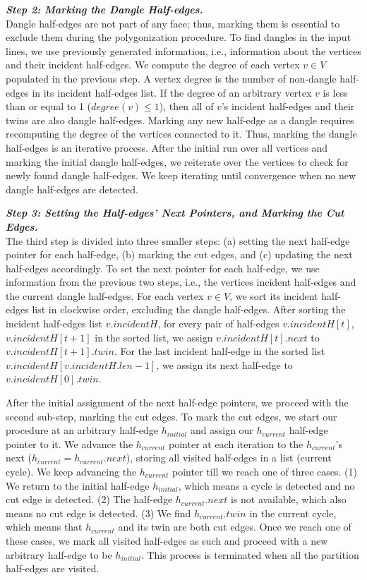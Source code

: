 \vspace{4pt}
\textit{\textbf{Step 2: Marking the Dangle Half-edges.}}
\\
Dangle half-edges are not part of any face; thus, marking them is essential to exclude them during the polygonization procedure. To find dangles in the input 
lines, we use previously generated information, i.e., information about the vertices and their incident half-edges. 
We compute the degree of each vertex $v \in V$ populated in the previous step. A vertex degree is the number of non-dangle half-edges in its incident half-edges 
list. If the degree of an arbitrary vertex $v$ is less than or equal to 1 ($degree(v) \le 1$), then all of $v$'s incident half-edges and their twins are also 
dangle half-edges. 
Marking any new half-edge as a dangle requires recomputing the degree of the vertices connected to it. 
Thus, marking the dangle half-edges is an iterative process. After the initial run over all vertices and marking the initial dangle half-edges, we reiterate 
over the vertices to check for newly found dangle half-edges. We keep iterating until convergence when no new dangle half-edges are detected.


\vspace{4pt}
\textit{\textbf{Step 3: Setting the Half-edges' Next Pointers, and Marking the Cut Edges.}}
\\
The third step is divided into three smaller steps: (a) setting the next half-edge pointer for each half-edge, (b) marking the cut edges, and (c) updating the 
next half-edges accordingly.
To set the next pointer for each half-edge, we use information from the previous two steps, i.e., the vertices incident half-edges and the current dangle 
half-edges.
For each vertex $v \in V$, we sort its incident half-edges list in clockwise order, excluding the dangle half-edges. 
After sorting the incident half-edges list $v.incidentH$, for every pair of half-edges $v.incidentH[t]$, $v.incidentH[t+1]$ in the sorted list, we assign 
$v.incidentH[t].next$ to $v.incidentH[t+1].twin$. For the last incident half-edge in the sorted list $v.incidentH[v.incidentH.len-1]$, we assign its next 
half-edge to $v.incidentH[0].twin$.


After the initial assignment of the next half-edge pointers, we proceed with the second sub-step, marking the cut edges.
To mark the cut edges, we start our procedure at an arbitrary half-edge $h_{initial}$ and assign our $h_{current}$ half-edge pointer to it. We advance the 
$h_{current}$ pointer at each iteration to the $h_{current}$'s next ($h_{current} = h_{current}.next$), storing all visited half-edges in a list (current 
cycle). We keep advancing the $h_{current}$ pointer till we reach one of three cases.
(1) We return to the initial half-edge $h_{initial}$, which means a cycle is detected and no cut edge is detected.
(2) The half-edge $h_{current}.next$ is not available, which also means no cut edge is detected.
(3) We find $h_{current}.twin$ in the current cycle, which means that $h_{current}$ and its twin are both cut edges. 
Once we reach one of these cases, we mark all visited half-edges as such and proceed with a new arbitrary half-edge to be $h_{initial}$.
This process is terminated when all the partition half-edges are visited.


